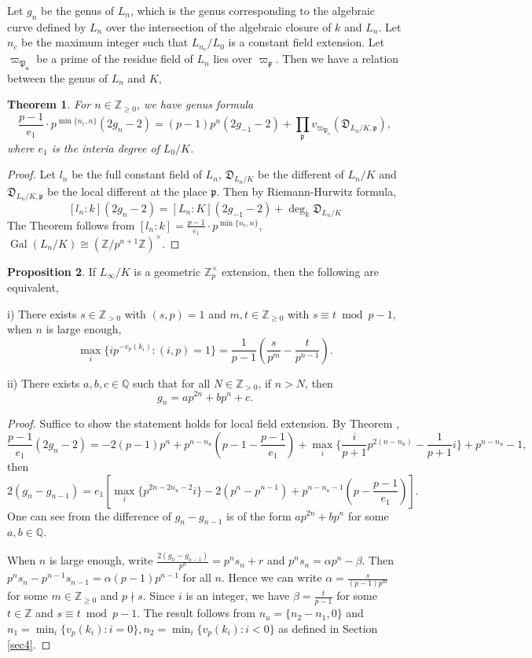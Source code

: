 \documentclass{proc-l}
\newtheorem{theorem}{Theorem}[section]
\theoremstyle{definition}
\newtheorem{proposition}[theorem]{Proposition}
\theoremstyle{remark}
\numberwithin{equation}{section}
\DeclareMathOperator{\Gal}{Gal}
\begin{document}
Let $g_{n}$ be the genus of $L_{n}$, which is the genus corresponding to the algebraic curve defined by $L_{n}$ over the intersection of the algebraic closure of $k$ and $L_{n}$. Let $n_c$ be the maximum integer such that $L_{n_c}/L_{0}$ is a constant field extension. Let $\varpi_{\mathfrak {P_n}}$ be a prime of the residue field of $L_{n}$ lies over $\varpi_{\mathfrak p}$. Then we have a relation between the genus of $L_{n}$ and $K$,
\begin{theorem}\label{5.1}
    For $n\in\mathbb Z_{\geq0}$, we have genus formula
    $$\frac{p-1}{e_1}\cdot p^{\min\{n_c,n\}}(2g_n-2)=(p-1)p^{n}(2g_{-1}-2)+\prod_{\mathfrak p}v_{\varpi_{\mathfrak P_n}}(\mathfrak D_{L_{n}/K,\mathfrak p}),$$
    where $e_1$ is the interia degree of $L_0/K$.
\end{theorem}
\begin{proof}
    Let $l_n$ be the full constant field of $L_{n}$, $\mathfrak D_{L_{n}/K}$ be the different of $L_{n}/K$ and $\mathfrak D_{L_{n}/K,\mathfrak p}$ be the local different at the place $\mathfrak p$. Then by Riemann-Hurwitz formula,
    $$[l_n:k](2g_n-2)=[L_{n}:K](2g_{-1}-2)+\deg_{k}\mathfrak D_{L_{n}/K}$$
    The Theorem follows from $[l_n:k]=\frac{p-1}{e_1}\cdot p^{\min\{n_c,n\}}$, $\Gal(L_{n}/K)\cong(\mathbb Z/p^{n+1}\mathbb Z)^\times$.
\end{proof}
\begin{proposition}\label{4.18}
    If $L_{\infty}/K$ is a geometric $\mathbb Z_p^\times$ extension, then the following are equivalent,

    i) There exists $s\in\mathbb Z_{>0}$ with $(s,p)=1$ and $m,t\in\mathbb Z_{\geq0}$ with $s\equiv t\bmod p-1$, when $n$ is large enough, $$\max_i\{ip^{-v_p(k_i)}:(i,p)=1\}=\frac{1}{p-1}(\frac{s}{p^m}-\frac{t}{p^{n-1}}).$$


    ii) There exists $a,b,c\in\mathbb Q$ such that for all $N\in\mathbb Z_{>0}$, if $n>N$, then $$g_n=ap^{2n}+bp^n+c.$$
\end{proposition}
\begin{proof}
    Suffice to show the statement holds for local field extension. By Theorem \boxed{\ref{5.1}}, $$\frac{p-1}{e_1}(2g_n-2)=-2(p-1)p^{n}+p^{n-n_u}(p-1-\frac{p-1}{e_1})+\max_i\{\frac{i}{p+1}p^{2(n-n_u)}-\frac{1}{p+1}i\}+p^{n-n_u}-1,$$ 
    then $$2(g_n-g_{n-1})=e_1[\max_i\{p^{2n-2n_u-2}i\}-2(p^{n}-p^{n-1})+p^{n-n_u-1}(p-\frac{p-1}{e_1})].$$
    One can see from the difference of $g_n-g_{n-1}$ is of the form $ap^{2n}+bp^n$ for some $a,b\in\mathbb Q$.

    When $n$ is large enough, write $\frac{2(g_n-g_{n-1})}{p^n}=p^{n}s_n+r$ and $p^ns_n=\alpha p^n-\beta$. Then $p^ns_n-p^{n-1}s_{n-1}=\alpha(p-1)p^{n-1}$ for all $n$. Hence we can write $\alpha=\frac{s}{(p-1)p^m}$ for some $m\in\mathbb Z_{\geq0}$ and $p\nmid s$. Since $i$ is an integer, we have $\beta=\frac{t}{p-1}$ for some $t\in\mathbb Z$ and $s\equiv t\bmod p-1$. The result follows from $n_u=\{n_2-n_1,0\}$ and $n_1=\min_i\{v_p(k_i):i=0\},n_2=\min_i\{v_p(k_i):i<0\}$ as defined in  Section \ref{sec4}.
\end{proof}
\end{document}
